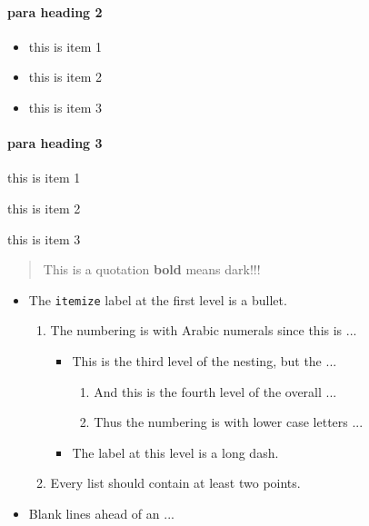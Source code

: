 \documentclass [a4paper,12pt] {article}
\begin{document}
\paragraph{para heading 2}
\begin{itemize}
\item this is item 1
\item this is item 2
\item this is item 3
\end{itemize}

\paragraph{para heading 3}
\begin{description}
\item[hello:] this is item 1
\item[world:] this is item 2
\item this is item 3
\end{description}


\begin{quote}
This is a quotation {\bf bold} means dark!!!
\end{quote}

\begin{itemize}
  \item The {\tt itemize} label at the first level is a bullet.
    \begin{enumerate}
       \item The numbering is with Arabic numerals since this is ...
         \begin{itemize}
            \item This is the third level of the nesting, but the ...
              \begin{enumerate}
                \item And this is the fourth level of the overall ...
                \item Thus the numbering is with lower case letters ...
              \end{enumerate}
            \item The label at this level is a long dash.
         \end{itemize}
       \item Every list should contain at least two points.
    \end{enumerate}
  \item Blank lines ahead of an ...
\end{itemize}
\end{document}
